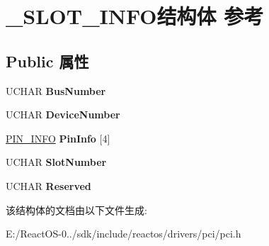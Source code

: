 \hypertarget{struct___s_l_o_t___i_n_f_o}{}\section{\+\_\+\+S\+L\+O\+T\+\_\+\+I\+N\+F\+O结构体 参考}
\label{struct___s_l_o_t___i_n_f_o}
\subsection*{Public 属性}
\begin{DoxyCompactItemize}
\item 
\mbox{\label{struct___s_l_o_t___i_n_f_o_a5269efd710df3e6fdd7c1b79ebfcf79e}} 
U\+C\+H\+AR {\bfseries Bus\+Number}
\item 
\mbox{\label{struct___s_l_o_t___i_n_f_o_a3498098df34c272282a1f21939d2c5c1}} 
U\+C\+H\+AR {\bfseries Device\+Number}
\item 
\mbox{\label{struct___s_l_o_t___i_n_f_o_ac5c18e8d80c5d5a9e2d8203621dff61d}} 
\hyperlink{struct_p_i_n___i_n_f_o}{P\+I\+N\+\_\+\+I\+N\+FO} {\bfseries Pin\+Info} \mbox{[}4\mbox{]}
\item 
\mbox{\label{struct___s_l_o_t___i_n_f_o_ae30afa93ca853460d8f24ffe812e9d0c}} 
U\+C\+H\+AR {\bfseries Slot\+Number}
\item 
\mbox{\label{struct___s_l_o_t___i_n_f_o_ac452a0a750cfeaaf694fcc7439d90804}} 
U\+C\+H\+AR {\bfseries Reserved}
\end{DoxyCompactItemize}


该结构体的文档由以下文件生成\+:\begin{DoxyCompactItemize}
\item 
E\+:/\+React\+O\+S-\/0../sdk/include/reactos/drivers/pci/pci.\+h\end{DoxyCompactItemize}
